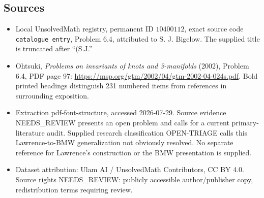 \documentclass[11pt]{article}
\begin{document}
\subsection{Sources}
\begin{itemize}
\item Local UnsolvedMath registry, permanent ID \(10400112\), exact source code \texttt{catalogue entry}, Problem 6.4, attributed to S. J. Bigelow. The supplied title is truncated after ``(S.J.''
\item Ohtsuki, \emph{Problems on invariants of knots and 3-manifolds} (2002), Problem 6.4, PDF page 97: \url{https://msp.org/gtm/2002/04/gtm-2002-04-024s.pdf}. Bold printed headings distinguish 231 numbered items from references in surrounding exposition.
\item Extraction pdf-font-structure, accessed 2026-07-29. Source evidence NEEDS\_REVIEW presents an open problem and calls for a current primary-literature audit. Supplied research classification OPEN-TRIAGE calls this Lawrence-to-BMW generalization not obviously resolved. No separate reference for Lawrence's construction or the BMW presentation is supplied.
\item Dataset attribution: Ulam AI / UnsolvedMath Contributors, CC BY 4.0. Source rights NEEDS\_REVIEW: publicly accessible author/publisher copy, redistribution terms requiring review.
\end{itemize}
\end{document}
